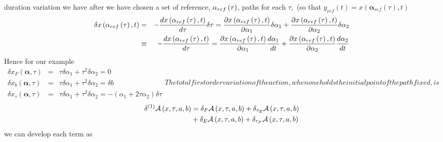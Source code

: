 \documentclass[aps,preprint]{revtex4}
\begin{document}
duration variation we have after we have chosen a set of reference, $\mathbf{%
\alpha }_{ref}\left( \tau \right) $, paths for each $\tau ,$ (so that $%
y_{ref}\left( t\right) =x\left( \mathbf{\alpha }_{ref}\left( \tau \right)
,t\right) $%
\begin{eqnarray}
\delta x\left( \mathbf{\alpha }_{ref}\left( \tau \right) ,t\right) &=&-\frac{%
dx\left( \mathbf{\alpha }_{ref}\left( \tau \right) ,t\right) }{d\tau }\delta
\tau =\frac{\partial x\left( \mathbf{\alpha }_{ref}\left( \tau \right)
,t\right) }{\partial \alpha _{1}}\delta \alpha _{1}+\frac{\partial x\left(
\mathbf{\alpha }_{ref}\left( \tau \right) ,t\right) }{\partial \alpha _{2}}%
\delta \alpha _{2} \\
&\equiv &-\frac{dx\left( \mathbf{\alpha }_{ref}\left( \tau \right) ,t\right)
}{d\tau }=\frac{\partial x\left( \mathbf{\alpha }_{ref}\left( \tau \right)
,t\right) }{\partial \alpha _{1}}\frac{d\alpha _{1}}{dt}+\frac{\partial
x\left( \mathbf{\alpha }_{ref}\left( \tau \right) ,t\right) }{\partial
\alpha _{2}}\frac{d\alpha _{2}}{dt}
\end{eqnarray}%
Hence for our example
\begin{subequations}
\begin{eqnarray}
\delta x_{F}\left( \mathbf{\alpha ,}\tau \right) &=&\tau \delta \alpha
_{1}+\tau ^{2}\delta \alpha _{2}=0 \\
\delta x_{b}\left( \mathbf{\alpha ,}\tau \right) &=&\tau \delta \alpha
_{1}+\tau ^{2}\delta \alpha _{2}=\delta b \\
\delta x_{\tau }\left( \mathbf{\alpha ,}\tau \right) &=&\tau \delta \alpha
_{1}+\tau ^{2}\delta \alpha _{2}=-\left( \alpha _{1}+2\tau \alpha
_{2}\right) \delta \tau
\end{eqnarray}

The total first order variation of the action, when one holds the initial
point of the path fixed, is
\end{subequations}
\begin{align}
\delta ^{\left( 1\right) }\mathcal{A}\left( x,\tau ,a,b\right) & =\delta _{F}%
\mathcal{A}\left( x,\tau ,a,b\right) +\delta _{\tau _{E}}\mathcal{A}\left(
x,\tau ,a,b\right)   \notag \\
& +\delta _{E}\mathcal{A}\left( x,\tau ,a,b\right) +\delta _{\tau _{P}}%
\mathcal{A}\left( x,\tau ,a,b\right)
\end{align}%
we can develop each term as
\end{document}

